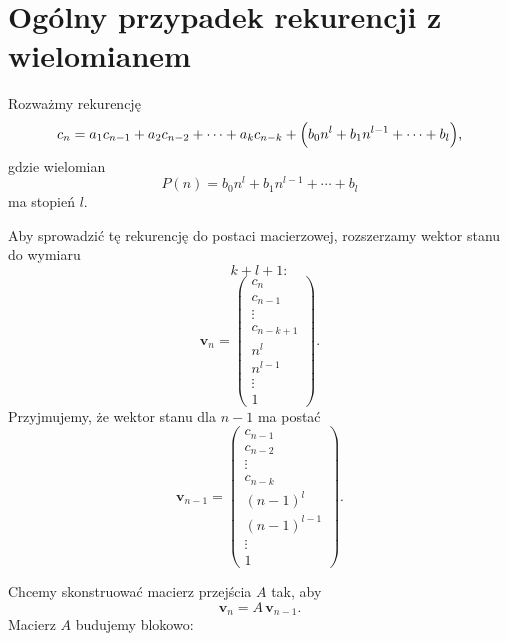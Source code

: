 \documentclass[12pt]{article}
\begin{document}
\section*{Ogólny przypadek rekurencji z wielomianem}

Rozważmy rekurencję
\[
c_n = a_1 c_{n-1} + a_2 c_{n-2} + \cdots + a_k c_{n-k} + \Bigl(b_0 n^l + b_1 n^{l-1} + \cdots + b_l\Bigr),
\]
gdzie wielomian
\[
P(n) = b_0 n^l + b_1 n^{l-1} + \cdots + b_l
\]
ma stopień \(l\).

Aby sprowadzić tę rekurencję do postaci macierzowej, rozszerzamy wektor stanu do wymiaru
\[
k + l + 1:
\]
\[
\mathbf{v}_n = \begin{pmatrix}
c_n \\[1mm]
c_{n-1} \\[1mm]
\vdots \\[1mm]
c_{n-k+1} \\[1mm]
n^l \\[1mm]
n^{l-1} \\[1mm]
\vdots \\[1mm]
1
\end{pmatrix}.
\]
Przyjmujemy, że wektor stanu dla \( n-1 \) ma postać
\[
\mathbf{v}_{n-1} = \begin{pmatrix}
c_{n-1} \\[1mm]
c_{n-2} \\[1mm]
\vdots \\[1mm]
c_{n-k} \\[1mm]
(n-1)^l \\[1mm]
(n-1)^{l-1} \\[1mm]
\vdots \\[1mm]
1
\end{pmatrix}.
\]

Chcemy skonstruować macierz przejścia \(A\) tak, aby
\[
\mathbf{v}_n = A\,\mathbf{v}_{n-1}.
\]
Macierz \(A\) budujemy blokowo:
\end{document}

